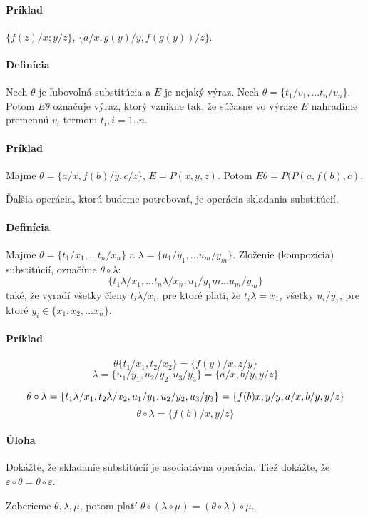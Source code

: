 \paragraph{Príklad} $\{ f(z)/x; y/z\}$, $\{ a/x, g(y)/y, f(g(y))/z\}$.

\paragraph{Definícia} Nech $\theta$ je ľubovoľná substitúcia a $E$ je nejaký
výraz. Nech $\theta = \{ t_1/v_1, \ldots t_n/v_n\}$. Potom $E\theta$ označuje
výraz, ktorý vznikne tak, že súčasne vo výraze $E$ nahradíme premennú $v_i$
termom $t_i, i=1..n$.

\paragraph{Príklad} Majme $\theta=\{a/x, f(b)/y, c/z\}$, $E = P(x, y, z)$. Potom
$E\theta = P(P(a, f(b), c)$.

\par Ďalšia operácia, ktorú budeme potrebovať, je operácia skladania
substitúcií.

\paragraph{Definícia} Majme $\theta = \{t_1/x_1, \ldots t_n/x_n\}$ a $\lambda =
\{ u_1/y_1, \ldots u_m/y_m \}$. Zloženie (kompozícia) substitúcií, označíme
$\theta \circ \lambda$:
$$\{t_1 \lambda/x_1, \ldots t_n \lambda/x_n, u_1/y_1m \ldots u_m/y_m \}$$ také,
že vyradí všetky členy $t_i\lambda/x_i$, pre ktoré platí, že $t_i \lambda = x_1$,
všetky $u_i/y_1$, pre ktoré $y_i \in \{x_1, x_2, \ldots x_n\}$.

\paragraph{Príklad} 
$$\theta \{t_1/x_1, t_2/x_2\} = \{ f(y)/x, z/y\}$$
$$\lambda = \{ u_1/y_1, u_2/y_2, u_3/y_3\} = \{ a/x, b/y, y/z\}$$

$$ \theta \circ \lambda = \{ t_1 \lambda / x_1, t_2\lambda/x_2, u_1/y_1,
u_2/y_2, u_3/y_3\} = \\ 
\{ f(b)x, y/y, a/x, b/y, y/z\}$$
$$ \theta \circ \lambda = \{ f(b)/x, y/z\}$$

\paragraph{Úloha} Dokážte, že skladanie substitúcií je asociatávna operácia.
Tiež dokážte, že $\varepsilon \circ \theta = \theta \circ \varepsilon$.
\par Zoberieme $\theta, \lambda, \mu$, potom platí $ \theta \circ(\lambda \circ
\mu) = (\theta \circ \lambda) \circ \mu$.

